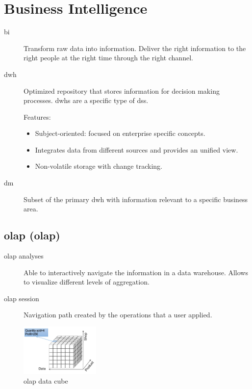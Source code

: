 \chapter{Business Intelligence}


\begin{description}
    \item[\Acl{bi}] 
        Transform raw data into information.
        Deliver the right information to the right people at the right time through the right channel.

    \item[\Ac{dwh}] 
        Optimized repository that stores information for decision making processes.
        \Acp{dwh} are a specific type of \ac{dss}.

        Features:
        \begin{itemize}
            \item Subject-oriented: focused on enterprise specific concepts.
            \item Integrates data from different sources and provides an unified view.
            \item Non-volatile storage with change tracking. 
        \end{itemize}

    \item[\Ac{dm}] 
        Subset of the primary \ac{dwh} with information relevant to a specific business area.
\end{description}



\section{\Acl{olap} (\Ac{olap})}

\begin{description}
    \item[\ac{olap} analyses] 
        Able to interactively navigate the information in a data warehouse.
        Allows to visualize different levels of aggregation.

    \item[\ac{olap} session] 
        Navigation path created by the operations that a user applied.
\end{description}

\begin{figure}[ht]
    \centering
    \includegraphics[width=0.35\textwidth]{img/_olap_cube.pdf}
    \caption{\ac{olap} data cube}
\end{figure}


